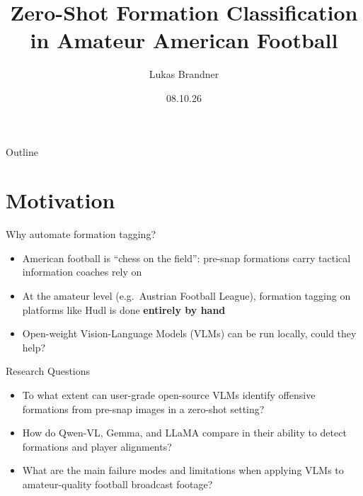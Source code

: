\documentclass[9pt,aspectratio=169]{beamer}
\title[Formation Classification]{Zero-Shot Formation Classification in Amateur American Football}
\author{Lukas Brandner}
\date{08.10.26}
\institute{IML}
\begin{document}
\begin{frame}[plain]
  \maketitle
\end{frame}

\begin{frame}{Outline}
  \tableofcontents
\end{frame}

\section{Motivation}

\begin{frame}{Why automate formation tagging?}
  \begin{itemize}
    \item American football is ``chess on the field'': pre-snap formations carry tactical information coaches rely on
    \item At the amateur level (e.g.\ Austrian Football League), formation tagging on platforms like Hudl is done \textbf{entirely by hand}
    \item Open-weight Vision-Language Models (VLMs) can be run locally, could they help?
  \end{itemize}
\end{frame}

\begin{frame}{Research Questions}
  \begin{itemize}
    \item[\textbf{RQ1}] To what extent can user-grade open-source VLMs identify offensive formations from pre-snap images in a zero-shot setting?
    \item[\textbf{RQ2}] How do Qwen-VL, Gemma, and LLaMA compare in their ability to detect formations and player alignments?
    \item[\textbf{RQ3}] What are the main failure modes and limitations when applying VLMs to amateur-quality football broadcast footage?
  \end{itemize}
\end{frame}
\end{document}
